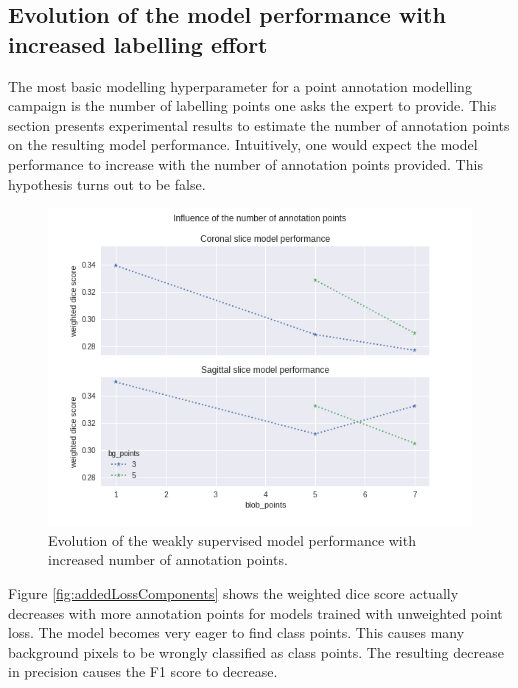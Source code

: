 \subsection{Evolution of the model performance with increased labelling effort\label{sec:numberofpoints}}
\par{
    The most basic modelling hyperparameter for a point annotation modelling campaign is the number of labelling points one asks the expert to provide.
    This section presents experimental results to estimate the number of annotation points on the resulting model performance.
    Intuitively, one would expect the model performance to increase with the number of annotation points provided.
    This hypothesis turns out to be false.
}
\begin{figure}
    \centering
    \includegraphics[width=.95\textwidth]{images/BlobPoints_influence.png}
    \caption{Evolution of the weakly supervised model performance with increased number of annotation points.\label{fig:points_influence}}
\end{figure}

\par{
    Figure \ref{fig:addedLossComponents} shows the weighted dice score actually decreases with more annotation points for models trained with unweighted point loss.
    The model becomes very eager to find class points. This causes many background pixels to be wrongly classified as class points.
    The resulting decrease in precision causes the F1 score to decrease.
}
